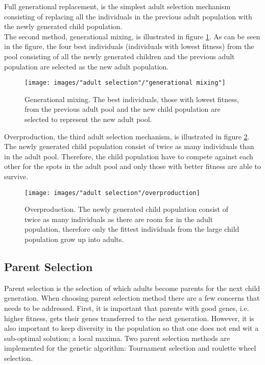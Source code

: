 \noindent Full generational replacement, is the simplest adult selection mechanism consisting of replacing all the individuals in the previous adult population with the newly generated child population. \\

\noindent The second method, generational mixing, is illustrated in figure \ref{figure:generational mixing}. As can be seen in the figure, the four best individuals (individuals with lowest fitness) from the pool consisting of all the newly generated children and the previous adult population are selected as the new adult population. \\


\begin{figure}[h!]
\begin{center}
\texttt{[image: images/"adult selection"/"generational mixing"]}
\caption{Generational mixing. The best individuals, those with lowest fitness, from the previous adult pool and the new child population are selected to represent the new adult pool.}
\label{figure:generational mixing}
\end{center}
\end{figure}


\noindent Overproduction, the third adult selection mechanism, is illustrated in figure \ref{figure:overproduction}. The newly generated child population consist of twice as many individuals than in the adult pool. Therefore, the child population have to compete against each other for the spots in the adult pool and only those with better fitness are able to survive. \\


\begin{figure}[h!]
\begin{center}
\texttt{[image: images/"adult selection"/overproduction]}
\caption{Overproduction. The newly generated child population consist of twice as many individuals as there are room for in the adult population, therefore only the fittest individuals from the large child population grow up into adults.}
\label{figure:overproduction}
\end{center}
\end{figure}



\subsection{Parent Selection}\label{subsection:parent selection}
Parent selection is the selection of which adults become parents for the next child generation. When choosing parent selection method there are a few concerns that needs to be addressed. First, it is important that parents with good genes, i.e. higher fitness, gets their genes transferred to the next generation. However, it is also important to keep diversity in the population so that one does not end wit a sub-optimal solution; a local maxima. Two parent selection methods are implemented for the genetic algorithm: Tournament selection and roulette wheel selection. \\

